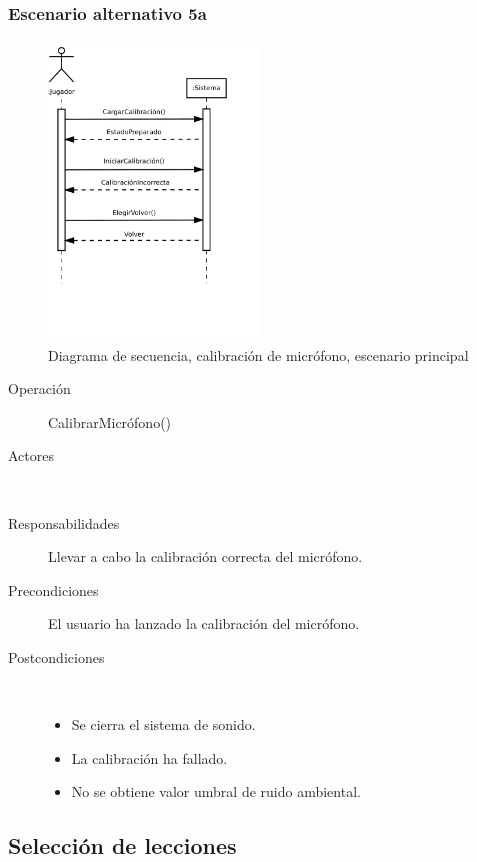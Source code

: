 \subsubsection{Escenario alternativo 5a}
\begin{figure}[h!]
  \centering
  \includegraphics[trim=0cm 8cm 0cm 0cm, clip=true, width=0.5\textwidth]{4_analisis/diagsec_caso6_esc2}
  \caption{Diagrama de secuencia, calibración de micrófono, escenario principal}
\end{figure}
\begin{description}
\item[Operación] CalibrarMicrófono()
\item[Actores] \jugador\, \sistema\
\item[Responsabilidades] Llevar a cabo la calibración correcta del micrófono.
\item[Precondiciones] El usuario ha lanzado la calibración del micrófono.
\item[Postcondiciones] $\quad$
  \begin{itemize}
  \item Se cierra el sistema de sonido.
  \item La calibración ha fallado.
  \item No se obtiene valor umbral de ruido ambiental.
  \end{itemize}
\end{description}

\subsection{Selección de lecciones}


